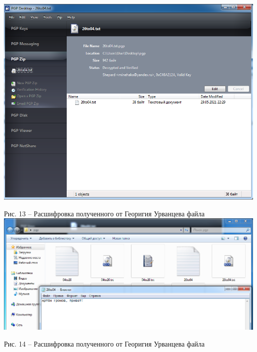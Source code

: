 \documentclass[a4paper,14pt]{extarticle}
\begin{document}
    \begin{center}
        \includegraphics[scale=0.6]{pics/15.png}

        Рис. 13 – Расшифровка полученного от Георигия Урванцева файла
        \includegraphics[scale=0.5]{pics/16.png}

        Рис. 14 – Расшифровка полученного от Георигия Урванцева файла
    \end{center}
\end{document}
